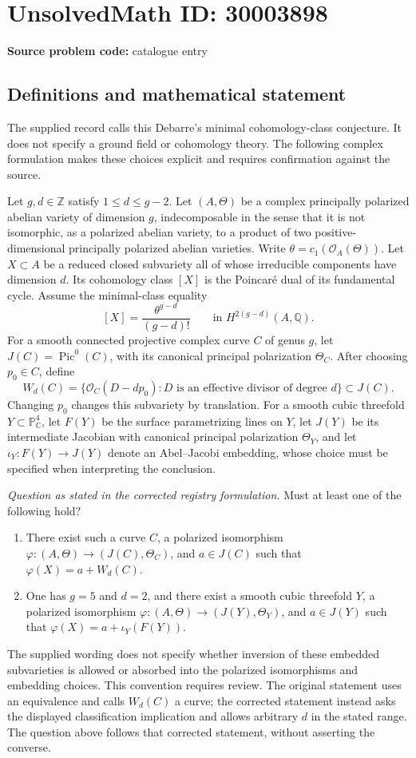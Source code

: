 \documentclass[11pt]{article}
\newcommand{\Z}{\mathbb{Z}}
\newcommand{\Q}{\mathbb{Q}}
\newcommand{\C}{\mathbb{C}}
\newcommand{\PP}{\mathbb{P}}
\begin{document}
\section*{UnsolvedMath ID: 30003898}
\textbf{Source problem code:} catalogue entry
\subsection{Definitions and mathematical statement}
The supplied record calls this Debarre's minimal cohomology-class conjecture. It does not specify a ground field or cohomology theory. The following complex formulation makes these choices explicit and requires confirmation against the source.

Let \(g,d\in\Z\) satisfy \(1\leq d\leq g-2\). Let \((A,\Theta)\) be a complex principally polarized abelian variety of dimension \(g\), indecomposable in the sense that it is not isomorphic, as a polarized abelian variety, to a product of two positive-dimensional principally polarized abelian varieties. Write \(\theta=c_1(\mathcal O_A(\Theta))\). Let \(X\subset A\) be a reduced closed subvariety all of whose irreducible components have dimension \(d\). Its cohomology class \([X]\) is the Poincar\'e dual of its fundamental cycle. Assume the minimal-class equality
\[
[X]=\frac{\theta^{g-d}}{(g-d)!}\qquad\text{in }H^{2(g-d)}(A,\Q).
\]
For a smooth connected projective complex curve \(C\) of genus \(g\), let \(J(C)=\operatorname{Pic}^0(C)\), with its canonical principal polarization \(\Theta_C\). After choosing \(p_0\in C\), define
\[
W_d(C)=\bigl\{\mathcal O_C(D-dp_0):D\text{ is an effective divisor of degree }d\bigr\}\subset J(C).
\]
Changing \(p_0\) changes this subvariety by translation. For a smooth cubic threefold \(Y\subset\PP^4_{\C}\), let \(F(Y)\) be the surface parametrizing lines on \(Y\), let \(J(Y)\) be its intermediate Jacobian with canonical principal polarization \(\Theta_Y\), and let \(\iota_Y:F(Y)\to J(Y)\) denote an Abel--Jacobi embedding, whose choice must be specified when interpreting the conclusion.

\emph{Question as stated in the corrected registry formulation.} Must at least one of the following hold?
\begin{enumerate}
\item There exist such a curve \(C\), a polarized isomorphism \(\varphi:(A,\Theta)\to(J(C),\Theta_C)\), and \(a\in J(C)\) such that \(\varphi(X)=a+W_d(C)\).
\item One has \(g=5\) and \(d=2\), and there exist a smooth cubic threefold \(Y\), a polarized isomorphism \(\varphi:(A,\Theta)\to(J(Y),\Theta_Y)\), and \(a\in J(Y)\) such that \(\varphi(X)=a+\iota_Y(F(Y))\).
\end{enumerate}
The supplied wording does not specify whether inversion of these embedded subvarieties is allowed or absorbed into the polarized isomorphisms and embedding choices. This convention requires review. The original statement uses an equivalence and calls \(W_d(C)\) a curve; the corrected statement instead asks the displayed classification implication and allows arbitrary \(d\) in the stated range. The question above follows that corrected statement, without asserting the converse.
\end{document}
